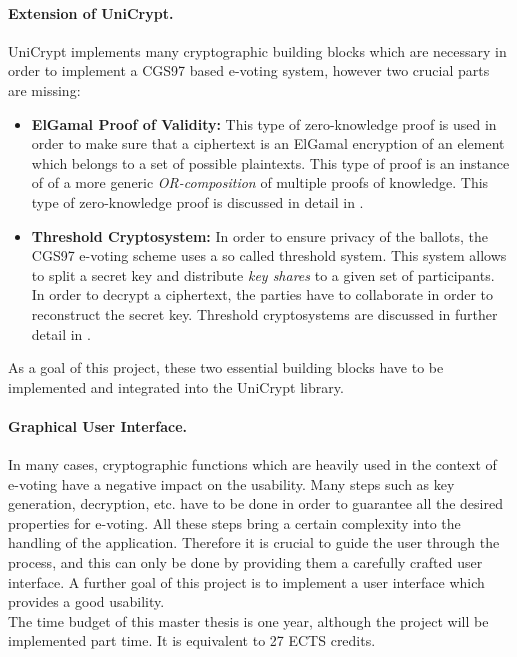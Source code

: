\documentclass[numbers=noenddot, abstract=on, a4paper, headsepline,
footsepline, oneside, draft=off]{scrreprt}
\begin{document}
\paragraph{Extension of UniCrypt.}
UniCrypt implements many cryptographic building blocks which are necessary in
order to implement a CGS97 based e-voting system, however two crucial parts are
missing:
\begin{itemize}
  \item \textbf{ElGamal Proof of Validity:} This type of zero-knowledge proof is
  used in order to make sure that a ciphertext is an ElGamal encryption of an
  element which belongs to a set of possible plaintexts. This type of proof is
  an instance of of a more generic \emph{OR-composition} of multiple proofs of
  knowledge. This type of zero-knowledge proof is discussed in detail in
  .
  \item \textbf{Threshold Cryptosystem:} In order to ensure privacy of
  the ballots, the CGS97 e-voting scheme uses a so called threshold system. This
  system allows to split a secret key and distribute \emph{key shares} to a
  given set of participants. In order to decrypt a ciphertext, the parties have
  to collaborate in order to reconstruct the secret key. Threshold cryptosystems
  are discussed in further detail in .
\end{itemize}

As a goal of this project, these two essential building blocks have to be
implemented and integrated into the UniCrypt library.

\paragraph{Graphical User Interface.}
In many cases, cryptographic functions which are heavily used in the context of
e-voting have a negative impact on the usability. Many steps such as key
generation, decryption, etc. have to be done in order to guarantee all the
desired properties for e-voting. All these steps bring a certain complexity
into the handling of the application. Therefore it is crucial to guide the user
through the process, and this can only be done by providing them a carefully
crafted user interface. A further goal of this project is to implement a user
interface which provides a good usability.
\\

The time budget of this master thesis is one year, although the project will be
implemented part time. It is equivalent to 27 ECTS credits.
\end{document}
